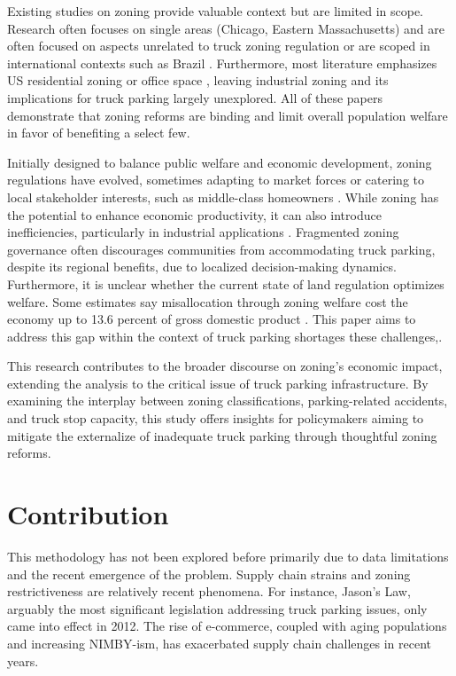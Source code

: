 \documentclass[
  12pt]{article}
\begin{document}
Existing studies on zoning provide valuable context but are limited in
scope. Research often focuses on single areas (Chicago, Eastern
Massachusetts) and are often focused on aspects unrelated to truck
zoning regulation
\citep{shertzerRaceEthnicityDiscriminatory2016, glaeserCausesConsequencesLand2009}
or are scoped in international contexts such as Brazil
\citep{anagolEstimatingEconomicValue2021}. Furthermore, most literature
emphasizes US residential zoning
\citep{lensStrictLandUse2016, huangResidentialLandUse2012}or office
space \citep{cheshireOfficeSpaceSupply2008}, leaving industrial zoning
and its implications for truck parking largely unexplored. All of these
papers demonstrate that zoning reforms are binding and limit overall
population welfare in favor of benefiting a select few.

Initially designed to balance public welfare and economic development,
zoning regulations have evolved, sometimes adapting to market forces or
catering to local stakeholder interests, such as middle-class homeowners
\citep{fischelEconomicHistoryZoning2024}. While zoning has the potential
to enhance economic productivity, it can also introduce inefficiencies,
particularly in industrial applications
\citep{mcdonaldPDFEconomicsZoning2012}. Fragmented zoning governance
often discourages communities from accommodating truck parking, despite
its regional benefits, due to localized decision-making dynamics.
Furthermore, it is unclear whether the current state of land regulation
optimizes welfare. Some estimates say misallocation through zoning
welfare cost the economy up to 13.6 percent of gross domestic product
\citep{osmanRestrictiveLandUse2020}. This paper aims to address this gap
within the context of truck parking shortages these challenges,.

This research contributes to the broader discourse on zoning's economic
impact, extending the analysis to the critical issue of truck parking
infrastructure. By examining the interplay between zoning
classifications, parking-related accidents, and truck stop capacity,
this study offers insights for policymakers aiming to mitigate the
externalize of inadequate truck parking through thoughtful zoning
reforms.

\section{Contribution}\label{contribution}

This methodology has not been explored before primarily due to data
limitations and the recent emergence of the problem. Supply chain
strains and zoning restrictiveness are relatively recent phenomena. For
instance, Jason's Law, arguably the most significant legislation
addressing truck parking issues, only came into effect in 2012. The rise
of e-commerce, coupled with aging populations and increasing NIMBY-ism,
has exacerbated supply chain challenges in recent years.
\end{document}
